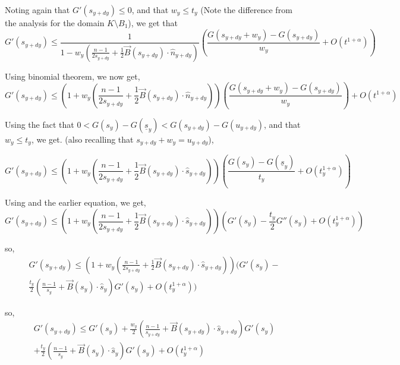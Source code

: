 \documentclass{article}
\theoremstyle{plain}
\theoremstyle{definition}
\theoremstyle{plain}
\begin{document}
Noting again that $G'(s_{y+dy}) \le 0$, and that $w_y \le t_y$ (Note the difference from the analysis for the domain $K \setminus B_1$), we get that
\begin{equation}
G'(s_{y+dy}) \le \frac{1}{1 - w_y \left( \frac{n-1}{2 s_{y+dy}} + \frac{1}{2} \vec{B}(s_{y+dy}) \cdot \hat{n}_{y+dy} \right)} \left( \frac{G(s_{y+dy} + w_y) - G(s_{y+dy})}{w_y} + O(t^{1+\alpha}) \right)
\end{equation}

Using binomial theorem, we now get,
\begin{equation} \label{10}
G'(s_{y+dy}) \le \left( 1 + w_y \left( \frac{n-1}{2 s_{y+dy}} + \frac{1}{2} \vec{B}(s_{y+dy}) \cdot \hat{n}_{y+dy} \right) \right) \left( \frac{G(s_{y+dy} + w_y) - G(s_{y+dy})}{w_y} \right) + O(t^{1+\alpha})
\end{equation}

Using the fact that $0 < G(s_y) - G(\underline{s}_y) < G(s_{y+dy}) - G(u_{y+dy})$, and that $w_y \le t_y$, we get. (also recalling that $s_{y+dy} + w_y = u_{y+dy}$),


\begin{equation}
G'(s_{y+dy}) \le \left( 1 + w_y \left( \frac{n-1}{2s_{y+dy}} + \frac{1}{2} \vec{B}(s_{y+dy}) \cdot \hat{s}_{y+dy} \right) \right) \left( \frac{G(s_y) - G(\underline{s}_y)}{t_y} + O(t_y^{1+\alpha}) \right)
\end{equation}

Using and the earlier equation, we get,
\begin{equation}
G'(s_{y+dy}) \le \left( 1 + w_y \left( \frac{n-1}{2s_{y+dy}} + \frac{1}{2} \vec{B}(s_{y+dy}) \cdot \hat{s}_{y+dy} \right) \right) \left( G'(s_y) - \frac{t_y}{2} G''(s_y) + O(t_y^{1+\alpha}) \right)
\end{equation}

so, \begin{align}
G'(s_{y+dy}) \le \left( 1 + w_y \left( \frac{n-1}{2s_{y+dy}} + \frac{1}{2} \vec{B}(s_{y+dy}) \cdot \hat{s}_{y+dy} \right) \right) \Bigg( G'(s_y) - \\ \frac{t_y}{2} \left( \frac{n-1}{s_y} + \vec{B}(s_y) \cdot \hat{s}_y \right) G'(s_y) + O(t_y^{1+\alpha}) \Bigg)
\end{align}

so, \begin{multline} \label{eq42}
G'(s_{y+dy}) \le G'(s_y) + \frac{w_y}{2} \left( \frac{n-1}{s_{y+dy}} + \vec{B}(s_{y+dy}) \cdot \hat{s}_{y+dy} \right) G'(s_y) \\+ \frac{t_y}{2} \left( \frac{n-1}{s_y} + \vec{B}(s_y) \cdot \hat{s}_y \right) G'(s_y) + O(t_y^{1+\alpha})
\end{multline}
\end{document}
